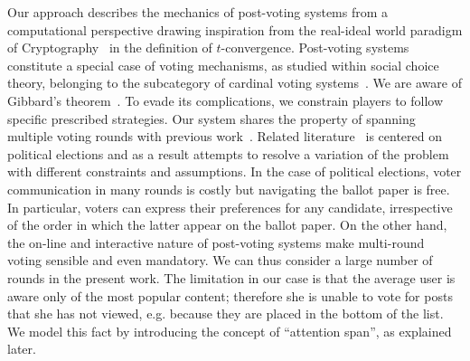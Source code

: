 Our approach describes the mechanics of post-voting systems from a computational perspective drawing inspiration from the real-ideal world paradigm of Cryptography~\cite{goldreich1999foundations,lindell} in the definition of $t$-convergence.
Post-voting systems constitute a special case of voting mechanisms, as studied within social choice theory, belonging to the subcategory of cardinal voting systems~\cite{hillinger2005case}. We are aware of Gibbard's theorem~\cite{gibbard1973manipulation}. To evade its complications, we constrain players to follow specific prescribed strategies. Our system shares the property of spanning multiple voting rounds with previous work~\cite{kalech2011practical}. Related literature~\cite{lu2011robust,conitzer2005communication,xia2010compilation} is centered on political elections and as a result attempts to resolve a variation of the problem with different constraints and assumptions. In the case of political elections, voter communication in many rounds is costly but navigating the ballot paper is free. In particular, voters can express their preferences for any candidate, irrespective of the order in which the latter appear on the ballot paper. On the other hand, the on-line and interactive nature of post-voting systems make multi-round voting sensible and even mandatory. We can thus consider a large number of rounds in the present work. The limitation in our case is that the average user is aware only of the most popular content; therefore she is unable to vote for posts that she has not viewed, e.g. because they are placed in the bottom of the list. We model this fact by introducing the concept of ``attention span'', as explained later.

